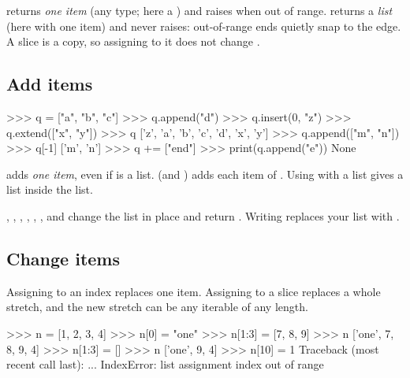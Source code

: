 \begin{typecheck}
 returns \emph{one item} (any type; here a ) and raises  when out of
range.  returns a \emph{list} (here with one item) and never raises: out-of-range ends
quietly snap to the edge. A slice is a copy, so assigning to it does not change .
\end{typecheck}

\subsection{Add items}

\begin{pycode}
>>> q = ["a", "b", "c"]
>>> q.append("d")
>>> q.insert(0, "z")
>>> q.extend(["x", "y"])
>>> q
['z', 'a', 'b', 'c', 'd', 'x', 'y']
>>> q.append(["m", "n"])
>>> q[-1]
['m', 'n']
>>> q += ["end"]
>>> print(q.append("e"))
None
\end{pycode}

\begin{trap}
 adds \emph{one item}, even if  is a list.  (and \code{+=})
adds each item of . Using  with a list gives a list inside the list.
\end{trap}

\begin{trap}
, , , , , , and 
change the list in place and return . Writing  replaces your list with
.
\end{trap}

\subsection{Change items}

Assigning to an index replaces one item. Assigning to a slice replaces a whole stretch, and the new stretch
can be any iterable of any length.

\begin{pycode}
>>> n = [1, 2, 3, 4]
>>> n[0] = "one"
>>> n[1:3] = [7, 8, 9]
>>> n
['one', 7, 8, 9, 4]
>>> n[1:3] = []
>>> n
['one', 9, 4]
>>> n[10] = 1
Traceback (most recent call last):
  ...
IndexError: list assignment index out of range
\end{pycode}

